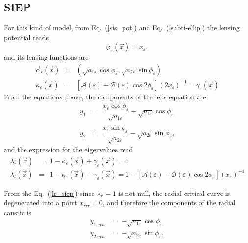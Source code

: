 \subsection{SIEP}
For this kind of model, from Eq.~(\ref{sis_pot}) and Eq.~(\ref{subti-ellip})
the lensing potential reads
\begin{equation}
 \varphi_\varepsilon(\vec{x})=x_\varepsilon,\label{siep_pot}
\end{equation}
 and its lensing functions are
\begin{eqnarray}
\vec{\alpha}_\varepsilon(\vec{x}) & = & (\sqrt{a_{1\varepsilon}
} \cos { \phi_ \varepsilon},\sqrt{a_{2\varepsilon}}\sin{\phi_\varepsilon})\\
\kappa_\varepsilon(\vec{x}) & = &
\left[\mathcal{A}(\varepsilon)-\mathcal{B}(\varepsilon)\cos{2\phi_\varepsilon}
\right](2 x_\varepsilon)^{-1}=\gamma_\varepsilon(\vec{x})
\end{eqnarray}
From the equations above, the components of the lens equation are
\begin{eqnarray}
 y_1&=&\dfrac{x_\varepsilon\cos{\phi_\varepsilon}}{\sqrt{a_{1\varepsilon}}}-\sqrt{a_{1\varepsilon}}\cos{\phi_ \varepsilon} \label{y1_siep}\\
y_2&=&\dfrac{x_\varepsilon\sin{\phi_\varepsilon}}{\sqrt{a_{2\varepsilon}}}-\sqrt{a_{2\varepsilon}}\sin{\phi_ \varepsilon} \label{y2_siep},
\end{eqnarray}
and the expression for the eigenvalues read
\begin{eqnarray}
\lambda_r(\vec{x})&=& 1-\kappa_\varepsilon(\vec{x})+\gamma_\varepsilon(\vec{x} )=1 \label{lr_siep}\\
\lambda_t(\vec{x})& =& 1-\kappa_\varepsilon(\vec{x})-\gamma_\varepsilon(\vec{x}
)=1-\left[\mathcal{A}(\varepsilon)-\mathcal{B}(\varepsilon)\cos{2\phi_\varepsilon } \right](x_\varepsilon)^{-1} \label{lt_siep}
\end{eqnarray}

From the Eq.~(\ref{lr_siep}) since $\lambda_r=1$ is not null, the radial critical curve is degenerated into a point $x_{rcc}=0$, and therefore the components of the radial caustic is
 \begin{eqnarray}
y_{1,rca} &=&-\sqrt{a_{1\varepsilon}}\cos{\phi_ \varepsilon}\\
y_{2,rca} &=&-\sqrt{a_{2\varepsilon}}\sin{\phi_ \varepsilon},
\end{eqnarray}

